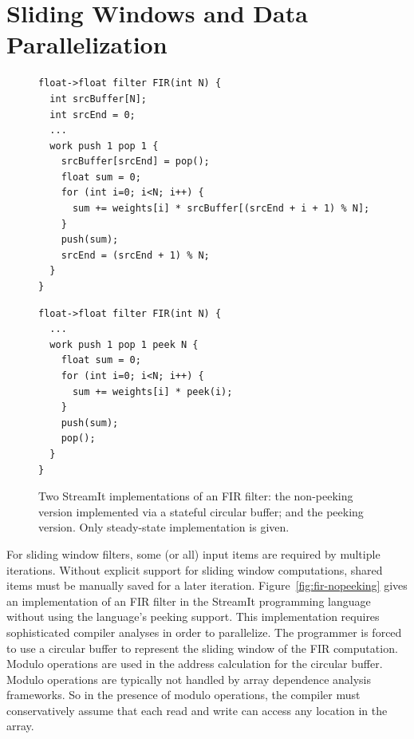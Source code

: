 \section{Sliding Windows and Data Parallelization}

\begin{figure}[t]
\centering
\begin{subfloat}
\begin{minipage}[b]{0.45\textwidth}
\eightpoint
\begin{verbatim}
float->float filter FIR(int N) {
  int srcBuffer[N];
  int srcEnd = 0; 
  ...
  work push 1 pop 1 {
    srcBuffer[srcEnd] = pop();
    float sum = 0;
    for (int i=0; i<N; i++) {
      sum += weights[i] * srcBuffer[(srcEnd + i + 1) % N];
    }
    push(sum);
    srcEnd = (srcEnd + 1) % N;
  }
}
\end{verbatim}
\vspace{-8pt}
\end{minipage}%
\caption{ \label{fig:fir-nopeeking}}
\end{subfloat}%
\qquad
\begin{subfloat}
\begin{minipage}[b]{0.45\textwidth}
\eightpoint
\begin{verbatim}
float->float filter FIR(int N) {
  ...
  work push 1 pop 1 peek N {
    float sum = 0;
    for (int i=0; i<N; i++) {
      sum += weights[i] * peek(i);
    }
    push(sum);
    pop();
  }
}
\end{verbatim}
\vspace{-18pt}
\end{minipage}
\caption{ \label{fig:fir-streamit}}
\end{subfloat}
\caption[Two implementations of an FIR filter.]{\label{fig:fir-code}
  Two StreamIt implementations of an FIR filter:
    the non-peeking version implemented via a
  stateful circular buffer; and  the peeking version. Only steady-state implementation is
  given.}
\end{figure}

For sliding window filters, some (or all) input items are required by
multiple iterations.  Without explicit support for sliding window
computations, shared items must be manually saved for a later
iteration.  Figure~\ref{fig:fir-nopeeking} gives an implementation of
an FIR filter in the StreamIt programming language without using the
language's peeking support.  This implementation requires
sophisticated compiler analyses in order to parallelize.
The programmer is forced to use a circular buffer to represent the
sliding window of the FIR computation.  Modulo operations are used in
the address calculation for the circular buffer.  Modulo operations
are typically not handled by array dependence analysis frameworks.  So
in the presence of modulo operations, the compiler must conservatively
assume that each read and write can access any location in the array.

